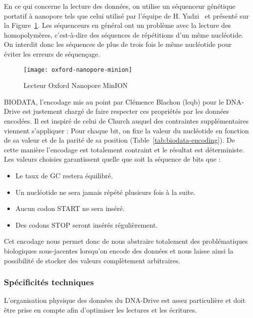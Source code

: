 \documentclass[a4paper]{report}
\begin{document}
En ce qui concerne la lecture des données, on utilise un séquenceur génétique portatif à
nanopore tels que celui utilisé par l’équipe de H. Yadzi~\cite{yazdi2017portable} et présenté sur la Figure~\ref{fig:oxford-nanopore-minion}.
Les séquenceurs en général ont un problème avec la lecture des homopolymères, c’est-à-dire des
séquences de répétitions d’un même nucléotide. On interdit donc les séquences de plus de trois fois
le même nucléotide pour éviter les erreurs de séquençage.

\begin{figure}[ht]
\centering
\texttt{[image: oxford-nanopore-minion]}
\caption{Lecteur Oxford Nanopore MinION}
\label{fig:oxford-nanopore-minion}
\end{figure}

BIODATA, l'encodage mis au point par Clémence Blachon (\ac{lcqb}) pour le DNA-Drive est justement chargé de faire respecter ces propriétés par les données encodées.
Il est inspiré de celui de Church auquel des contraintes supplémentaires viennent s'appliquer :
Pour chaque bit, on fixe la valeur du nucléotide en fonction de sa valeur et de la parité de sa position (Table~\ref{tab:biodata-encoding}).
De cette manière l'encodage est totalement contraint et le résultat est déterministe.
Les valeurs choisies garantissent quelle que soit la séquence de bits que :

\begin{itemize}
  \item Le taux de GC restera équilibré.
  \item Un nucléotide ne sera jamais répété plusieurs fois à la suite.
  \item Aucun codon START ne sera inséré.
  \item Des codons STOP seront insérés régulièrement.
\end{itemize}

Cet encodage nous permet donc de nous abstraire totalement des problématiques biologiques sous-jacentes lorsqu'on encode des données
et nous laisse ainsi la possibilité de stocker des valeurs complètement arbitraires.

\subsubsection{Spécificités techniques}

L'organisation physique des données du DNA-Drive est assez particulière et doit être prise en compte afin d'optimiser les lectures et les écritures.
\end{document}
